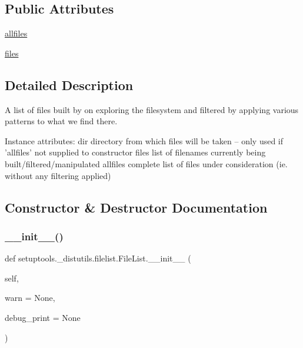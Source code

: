 \subsection*{Public Attributes}
\begin{DoxyCompactItemize}
\item 
\hyperlink{classsetuptools_1_1__distutils_1_1filelist_1_1FileList_a1819dd24956f65d94ba94baea3f548c4}{allfiles}
\item 
\hyperlink{classsetuptools_1_1__distutils_1_1filelist_1_1FileList_a5ef6a0159293f5a4ce1febf8a41891f0}{files}
\end{DoxyCompactItemize}


\subsection{Detailed Description}
\begin{DoxyVerb}A list of files built by on exploring the filesystem and filtered by
applying various patterns to what we find there.

Instance attributes:
  dir
    directory from which files will be taken -- only used if
    'allfiles' not supplied to constructor
  files
    list of filenames currently being built/filtered/manipulated
  allfiles
    complete list of files under consideration (ie. without any
    filtering applied)
\end{DoxyVerb}
 

\subsection{Constructor \& Destructor Documentation}
\mbox{\label{classsetuptools_1_1__distutils_1_1filelist_1_1FileList_a0c88f59650d62464970a15a6ef558594}} 
\subsubsection{\texorpdfstring{\+\_\+\+\_\+init\+\_\+\+\_\+()}{\_\_init\_\_()}}
{\footnotesize\ttfamily def setuptools.\+\_\+distutils.\+filelist.\+File\+List.\+\_\+\+\_\+init\+\_\+\+\_\+ (\begin{DoxyParamCaption}\item[{}]{self,  }\item[{}]{warn = {\ttfamily None},  }\item[{}]{debug\+\_\+print = {\ttfamily None} }\end{DoxyParamCaption})}



